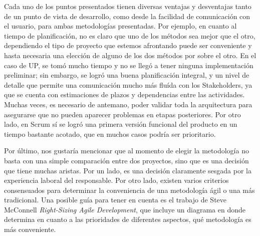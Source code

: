 Cada uno de los puntos presentados tienen diversas ventajas y desventajas tanto de un punto de vista de desarrollo, como desde la facilidad de comunicaci\'on con el usuario, para ambas metodolog\'ias presentadas. Por ejemplo, en cuanto al tiempo de planificaci\'on, no es claro que uno de los m\'etodos sea mejor que el otro, dependiendo el tipo de proyecto que estemos afrontando puede ser conveniente y hasta necesaria una elecci\'on de alguno de los dos m\'etodos por sobre el otro. En el caso de UP, se tom\'o mucho tiempo y no se lleg\'o a tener ninguna implementaci\'on preliminar; sin embargo, se logr\'o una buena planificaci\'on integral, y un nivel de detalle que permite una comunicaci\'on mucho m\'as flu\'ida con los Stakeholders, ya que se cuenta con estimaciones de plazos y dependencias entre las actividades. Muchas veces, es necesario de antemano, poder validar toda la arquitectura para asegurarse que no pueden aparecer problemas en etapas posteriores. Por otro lado, en Scrum s\'i se logr\'o una primera versi\'on funcional del producto en un tiempo bastante acotado, que en muchos casos podr\'ia ser prioritario.

Por \'ultimo, nos gustar\'ia mencionar que al momento de elegir la metodolog\'ia no basta con una simple comparaci\'on entre dos proyectos, sino que es una decisi\'on que tiene muchas aristas.  Por un lado, es una decisi\'on claramente sesgada por la experiencia laboral del responsable. Por otro lado, existen varios criterios consensuados para determinar la conveniencia de una metodolog\'ia \'agil o una m\'as tradicional. Una posible gu\'ia para tener en cuenta es el trabajo de Steve McConnell \emph{Right-Sizing Agile Development}, que incluye un diagrama en donde determina en cuanto a las prioridades de diferentes aspectos, qu\'e metodolog\'ia es m\'as conveniente.
